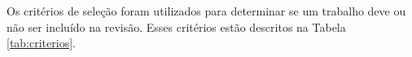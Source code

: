             Os critérios de seleção foram utilizados para determinar se um trabalho deve ou não ser incluído na revisão. Esses critérios estão descritos na Tabela \ref{tab:criterios}.
        
\begin{comment}

\begin{itemize}
            \item Estudos primários.
               \item Estudos publicado em qualquer ano até julho de 2018.
               \item Estudos que abordam nos objetivos comunicação de requisitos. 
               \item Estudos que relacionam requisitos e comunicação.
              
           \end{itemize}
    
            Da mesma forma, será adotado os seguintes critérios para exclusão:
      
            \begin{itemize}
                \item Artigos curtos (\emph{short papers}) com menos de quatro páginas.
                \item Estudos duplicados.
                \item Estudos incompletos.
                \item Estudos secundários.
                \item Estudos redundantes da mesma autoria.
                \item Estudos claramente irrelevantes para a pesquisa, levando em consideração as questões de pesquisa.
                \item Estudos cujo foco não se relaciona a comunicação de requisitos.
                \item Estudos cujo texto não esteja disponível.
                \item Literatura cinza (teses, dissertações, monografias, etc).
                \item Estudos não escritos em inglês.
            \end{itemize}
            
\end{comment}            
        

